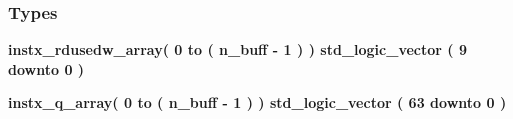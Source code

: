 \subsubsection*{Types}
 \begin{DoxyCompactItemize}
\item 
{\bfseries {\bf instx\+\_\+rdusedw\+\_\+array}{\bfseries \textcolor{vhdlchar}{(}\textcolor{vhdlchar}{ }\textcolor{vhdlchar}{ } \textcolor{vhdldigit}{0} \textcolor{vhdlchar}{ }\textcolor{keywordflow}{to}\textcolor{vhdlchar}{ }\textcolor{vhdlchar}{(}\textcolor{vhdlchar}{ }\textcolor{vhdlchar}{ }\textcolor{vhdlchar}{ }\textcolor{vhdlchar}{ }{\bfseries {\bf n\+\_\+buff}} \textcolor{vhdlchar}{-\/}\textcolor{vhdlchar}{ } \textcolor{vhdldigit}{1} \textcolor{vhdlchar}{ }\textcolor{vhdlchar}{)}\textcolor{vhdlchar}{ }\textcolor{vhdlchar}{)}\textcolor{vhdlchar}{ }\textcolor{vhdlchar}{ }\textcolor{comment}{std\+\_\+logic\+\_\+vector}\textcolor{vhdlchar}{ }\textcolor{vhdlchar}{(}\textcolor{vhdlchar}{ }\textcolor{vhdlchar}{ } \textcolor{vhdldigit}{9} \textcolor{vhdlchar}{ }\textcolor{keywordflow}{downto}\textcolor{vhdlchar}{ }\textcolor{vhdlchar}{ } \textcolor{vhdldigit}{0} \textcolor{vhdlchar}{ }\textcolor{vhdlchar}{)}\textcolor{vhdlchar}{ }}} 
\item 
{\bfseries {\bf instx\+\_\+q\+\_\+array}{\bfseries \textcolor{vhdlchar}{(}\textcolor{vhdlchar}{ }\textcolor{vhdlchar}{ } \textcolor{vhdldigit}{0} \textcolor{vhdlchar}{ }\textcolor{keywordflow}{to}\textcolor{vhdlchar}{ }\textcolor{vhdlchar}{(}\textcolor{vhdlchar}{ }\textcolor{vhdlchar}{ }\textcolor{vhdlchar}{ }\textcolor{vhdlchar}{ }{\bfseries {\bf n\+\_\+buff}} \textcolor{vhdlchar}{-\/}\textcolor{vhdlchar}{ } \textcolor{vhdldigit}{1} \textcolor{vhdlchar}{ }\textcolor{vhdlchar}{)}\textcolor{vhdlchar}{ }\textcolor{vhdlchar}{)}\textcolor{vhdlchar}{ }\textcolor{vhdlchar}{ }\textcolor{comment}{std\+\_\+logic\+\_\+vector}\textcolor{vhdlchar}{ }\textcolor{vhdlchar}{(}\textcolor{vhdlchar}{ }\textcolor{vhdlchar}{ } \textcolor{vhdldigit}{63} \textcolor{vhdlchar}{ }\textcolor{keywordflow}{downto}\textcolor{vhdlchar}{ }\textcolor{vhdlchar}{ } \textcolor{vhdldigit}{0} \textcolor{vhdlchar}{ }\textcolor{vhdlchar}{)}\textcolor{vhdlchar}{ }}} 
\end{DoxyCompactItemize}

